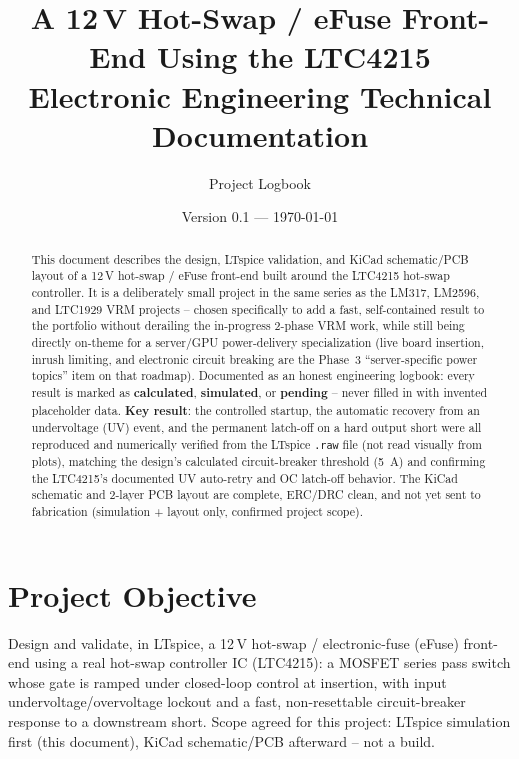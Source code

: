 \documentclass[11pt,letterpaper]{article}
\title{\textbf{A 12\,V Hot-Swap / eFuse Front-End Using the LTC4215} \\[4pt]
\large Electronic Engineering Technical Documentation}
\author{Project Logbook}
\date{Version 0.1 --- \today}
\begin{document}
\maketitle

\begin{abstract}
\noindent This document describes the design, LTspice validation, and KiCad schematic/PCB layout of a
12\,V hot-swap / eFuse front-end built around the LTC4215 hot-swap controller. It is a deliberately small
project in the same series as the LM317, LM2596, and LTC1929 VRM projects -- chosen specifically to add a
fast, self-contained result to the portfolio without derailing the in-progress 2-phase VRM work, while
still being directly on-theme for a server/GPU power-delivery specialization (live board insertion, inrush
limiting, and electronic circuit breaking are the Phase~3 ``server-specific power topics'' item on that
roadmap). Documented as an honest engineering logbook: every result is marked as \textbf{calculated},
\textbf{simulated}, or \textbf{pending} -- never filled in with invented placeholder data. \textbf{Key
result}: the controlled startup, the automatic recovery from an undervoltage (UV) event, and the permanent
latch-off on a hard output short were all reproduced and numerically verified from the LTspice
\texttt{.raw} file (not read visually from plots), matching the design's calculated circuit-breaker
threshold (\SI{5}{\ampere}) and confirming the LTC4215's documented UV auto-retry and OC latch-off
behavior. The KiCad schematic and 2-layer PCB layout are complete, ERC/DRC clean, and not yet
sent to fabrication (simulation + layout only, confirmed project scope).
\end{abstract}

\tableofcontents
\newpage

\section{Project Objective}

Design and validate, in LTspice, a 12\,V hot-swap / electronic-fuse (eFuse) front-end using a real hot-swap
controller IC (LTC4215): a MOSFET series pass switch whose gate is ramped under closed-loop control at
insertion, with input undervoltage/overvoltage lockout and a fast, non-resettable circuit-breaker response
to a downstream short. Scope agreed for this project: LTspice simulation first (this document), KiCad
schematic/PCB afterward -- not a build.
\end{document}
